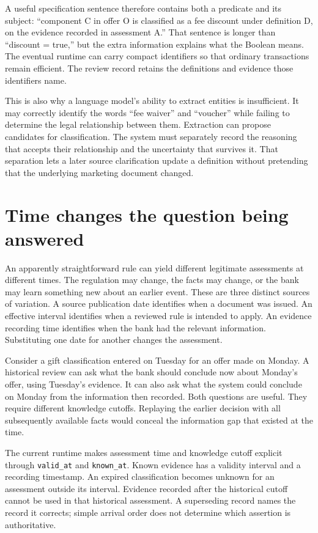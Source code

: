 A useful specification sentence therefore contains both a predicate and its
subject: ``component C in offer O is classified as a fee discount under
definition D, on the evidence recorded in assessment A.'' That sentence is longer
than ``discount = true,'' but the extra information explains what the Boolean
means. The eventual runtime can carry compact identifiers so that ordinary
transactions remain efficient. The review record retains the definitions and
evidence those identifiers name.

This is also why a language model's ability to extract entities is insufficient.
It may correctly identify the words ``fee waiver'' and ``voucher'' while failing
to determine the legal relationship between them. Extraction can propose
candidates for classification. The system must separately record the reasoning
that accepts their relationship and the uncertainty that survives it. That
separation lets a later source clarification update a definition without
pretending that the underlying marketing document changed.

\section{Time changes the question being answered}
\label{merge:M01:06}

\label{sec:problem-time}
An apparently straightforward rule can yield different legitimate assessments
at different times. The regulation may change, the facts may change, or the
bank may learn something new about an earlier event. These are three distinct
sources of variation. A source publication date identifies when a document was
issued. An effective interval identifies when a reviewed rule is intended to
apply. An evidence recording time identifies when the bank had the relevant
information. Substituting one date for another changes the assessment.

Consider a gift classification entered on Tuesday for an offer made on Monday.
A historical review can ask what the bank should conclude now about Monday's
offer, using Tuesday's evidence. It can also ask what the system could conclude
on Monday from the information then recorded. Both questions are useful. They
require different knowledge cutoffs. Replaying the earlier decision with all
subsequently available facts would conceal the information gap that existed at
the time.


The current runtime makes assessment time and knowledge cutoff explicit through
\texttt{valid\_at} and \texttt{known\_at}. Known evidence has a validity interval
and a recording timestamp. An expired classification becomes unknown for an
assessment outside its interval. Evidence recorded after the historical cutoff
cannot be used in that historical assessment. A superseding record names the
record it corrects; simple arrival order does not determine which assertion is
authoritative.

